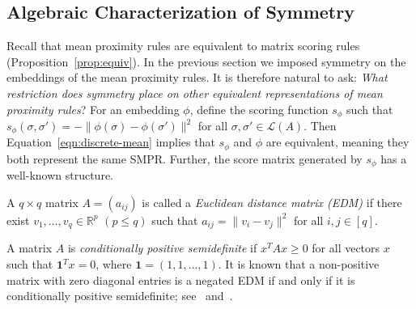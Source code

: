 \documentclass[prodmode]{acmsmall-ec14}
\newcommand{\calL}{{\mathcal{L}}}
\newcommand{\rank}{{\calL(A)}}
\newcommand{\ones}{\mathbf{1}}
\begin{document}
%




\subsection{Algebraic Characterization of Symmetry}
\label{sec:smpr-char}

Recall that mean proximity rules are equivalent to matrix scoring rules (Proposition~\ref{prop:equiv}). In the previous section we imposed symmetry on the embeddings of the mean proximity rules. It is therefore natural to ask: \emph{What restriction does symmetry place on other equivalent representations of mean proximity rules}? For an embedding $\phi$, define the scoring function $s_{\phi}$ such that $s_{\phi}(\sigma,\sigma') = -\|\phi(\sigma)-\phi(\sigma')\|^2$ for all $\sigma,\sigma' \in \rank$. Then Equation~\eqref{eqn:discrete-mean} implies that $s_{\phi}$ and $\phi$ are equivalent, meaning they both represent the same SMPR. Further, the score matrix generated by $s_{\phi}$ has a well-known structure.


\begin{definition}
A $q \times q$ matrix $A = (a_{ij})$ is called a \emph{Euclidean distance matrix (EDM)} if there exist $v_1,\ldots,v_q \in \mathbb{R}^p$ $(p \leq q)$ such that $a_{ij} = \|v_i-v_j\|^2$ for all $i,j \in [q]$. 
\end{definition}
%
A matrix $A$ is \emph{conditionally positive semidefinite} if $x^T A x \geq 0$ for all vectors $x$ such that $\ones^T x = 0$, where $\ones = (1,1,\ldots,1)$. It is known that a non-positive matrix with zero diagonal entries is a negated EDM if and only if it is conditionally positive semidefinite; see~\cite[Thm 3.10]{ikramov2000conditionally} and~\cite{schoenberg1938metric}.
\end{document}
